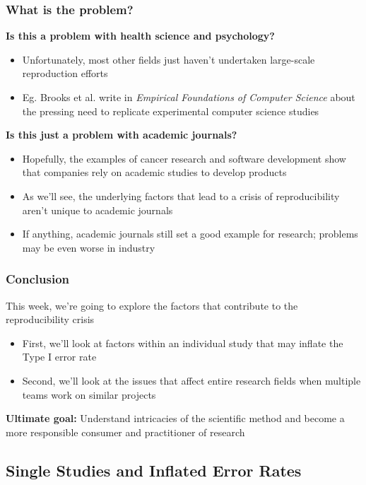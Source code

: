 \documentclass[10pt, block=fill]{beamer}
\begin{document}
\begin{frame}
  \frametitle{What is the problem?}
  
  \textbf{Is this a problem with health science and psychology?}
  \begin{itemize}
      \item Unfortunately, most other fields just haven't undertaken large-scale reproduction efforts
      \item Eg. Brooks et al. write in \textit{Empirical Foundations of Computer Science} about the pressing need to replicate experimental computer science studies
  \end{itemize}
  
  \textbf{Is this just a problem with academic journals?}
  \begin{itemize}
      \item Hopefully, the examples of cancer research and software development show that companies rely on academic studies to develop products
      \item As we'll see, the underlying factors that lead to a crisis of reproducibility aren't unique to academic journals
      \item If anything, academic journals still set a good example for research; problems may be even worse in industry
  \end{itemize}
    
\end{frame}


\begin{frame}
  \frametitle{Conclusion}

This week, we're going to explore the factors that contribute to the reproducibility crisis

  \begin{itemize}
    \item First, we'll look at factors within an individual study that may inflate the Type I error rate
    \item Second, we'll look at the issues that affect entire research fields when multiple teams work on similar projects
  \end{itemize}
  
  \textbf{Ultimate goal:} Understand intricacies of the scientific method and become a more responsible consumer and practitioner of research
\end{frame}



\subsection{Single Studies and Inflated Error Rates}
\end{document}
